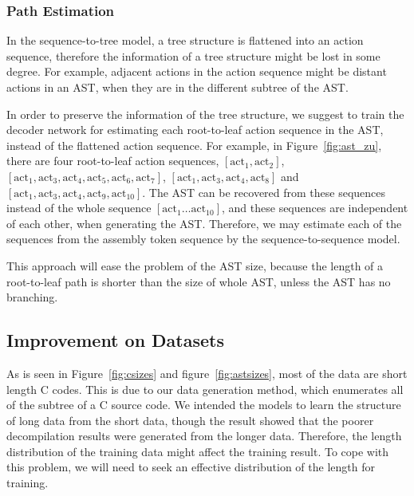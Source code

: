 \documentclass[senior,final,11pt]{iscs-thesis}
\begin{document}
\subsubsection{Path Estimation} 
In the sequence-to-tree model, a tree structure is flattened into an action sequence, 
therefore the information of a tree structure might be lost in some degree.
For example, adjacent actions in the action sequence might be distant actions in an AST, when they are in the different subtree of the AST.

In order to preserve the information of the tree structure, 
we suggest to train the decoder network for estimating each root-to-leaf action sequence in the AST,
instead of the flattened action sequence. 
For example, in Figure~\ref{fig:ast_zu}, there are four root-to-leaf action sequences, 
$ [\mathrm{act}_1, \mathrm{act}_2] $, $ [\mathrm{act}_1, \mathrm{act}_3,\mathrm{act}_4,\mathrm{act}_5,\mathrm{act}_6,\mathrm{act}_7] $, $ [\mathrm{act}_1, \mathrm{act}_3,\mathrm{act}_4,\mathrm{act}_8] $ and $ [\mathrm{act}_1, \mathrm{act}_3,\mathrm{act}_4,\mathrm{act}_9,\mathrm{act}_{10}] $.
The AST can be recovered from these sequences instead of the whole sequence $ [\mathrm{act}_1 \dots \mathrm{act}_{10}] $, 
and these sequences are independent of each other, when generating the AST.
Therefore, we may estimate each of the sequences from the assembly token sequence by the sequence-to-sequence model.

This approach will ease the problem of the AST size, because the length of a root-to-leaf path is shorter than the size of whole AST, unless the AST has no branching.







\subsection{Improvement on Datasets}
As is seen in Figure~\ref{fig:csizes} and figure~\ref{fig:astsizes}, most of the data are short length C codes.
This is due to our data generation method, which enumerates all of the subtree of a C source code.
We intended the models to learn the structure of long data from the short data, though the result showed that 
the poorer decompilation results were generated from the longer data.
Therefore, the length distribution of the training data might affect the training result.
To cope with this problem, we will need to seek an effective distribution of the length for training.





\end{document}
